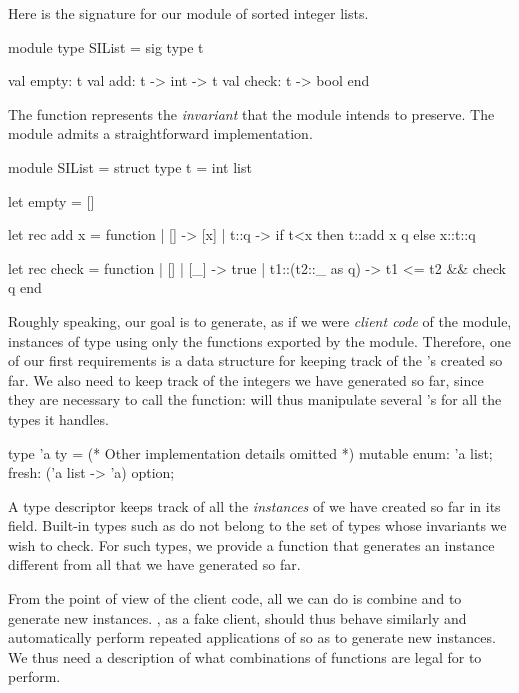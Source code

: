 Here is the signature for our module of sorted integer lists.
%
\begin{ocamlcode}
module type SIList = sig
  type t

  val empty: t
  val add: t -> int -> t
  val check: t -> bool
end
\end{ocamlcode}
%
The  function represents the \emph{invariant} that the module
intends to preserve. The module admits a straightforward implementation.
%
\begin{ocamlcode}
module SIList = struct
  type t = int list

  let empty = []

  let rec add x = function
    | [] -> [x]
    | t::q -> if t<x then t::add x q else x::t::q

  let rec check = function
    | [] | [_] -> true
    | t1::(t2::_ as q) -> t1 <= t2 && check q
end
\end{ocamlcode}
%
Roughly speaking, our goal is to generate, as if we were \emph{client code} of
the module, instances of type  using only the functions exported by the
module. Therefore, one of our first requirements is a data structure for keeping
track of the 's created so far. We also need to keep track of the
integers we have generated so far, since they are necessary to call the
 function: \arti will thus manipulate several 's for all the
types it handles.
%
\begin{ocamlcode}
type 'a ty = {
  (* Other implementation details omitted *)
  mutable enum: 'a list;
  fresh: ('a list -> 'a) option;
}
\end{ocamlcode}
%
A type descriptor  keeps track of all the \emph{instances} of
 we have created so far in its  field. Built-in types such
as  do not belong to the set of types whose invariants we wish to
check. For such types, we provide a  function that generates an
instance different from all that we have generated so far.

From the point of view of the client code, all we can do is combine
 and  to generate new instances. \arti, as a fake client,
should thus behave similarly and automatically perform repeated applications of
 so as to generate new instances. We thus need a description of what
combinations of functions are legal for \arti to perform.

